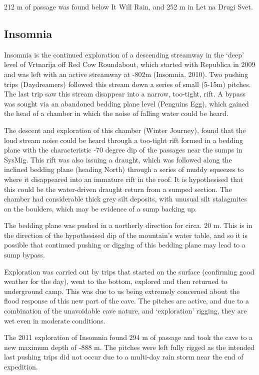 212 m of passage was found below It Will Rain, and 252 m in Let na Drugi
Svet.

\subsection{Insomnia}

Insomnia is the continued exploration of a descending streamway in the
`deep' level of Vrtnarija off Red Cow Roundabout, which started with
Republica in 2009 and was left with an active streamway at -802m
(Insomnia, 2010). Two pushing trips (Daydreamers) followed this stream
down a series of small (5-15m) pitches. The last trip saw this stream
disappear into a narrow, too-tight, rift. A bypass was sought via an
abandoned bedding plane level (Penguins Egg), which gained the head of a
chamber in which the noise of falling water could be heard.

The descent and exploration of this chamber (Winter Journey), found that
the loud stream noise could be heard through a too-tight rift formed in
a bedding plane with the characteristic -70 degree dip of the passages
near the sumps in SysMig. This rift was also issuing a draught, which
was followed along the inclined bedding plane (heading North) through a
series of muddy squeezes to where it disappeared into an immature rift
in the roof. It is hypothesised that this could be the water-driven
draught return from a sumped section. The chamber had considerable thick
grey silt deposits, with unusual silt stalagmites on the boulders, which
may be evidence of a sump backing up.

The bedding plane was pushed in a northerly direction for circa. 20 m.
This is in the direction of the hypothesised dip of the mountain's water
table, and so it is possible that continued pushing or digging of this
bedding plane may lead to a sump bypass.

Exploration was carried out by trips that started on the surface
(confirming good weather for the day), went to the bottom, explored and
then returned to underground camp. This was due to us being extremely
concerned about the flood response of this new part of the cave. The
pitches are active, and due to a combination of the unavoidable cave
nature, and `exploration' rigging, they are wet even in moderate
conditions.

The 2011 exploration of Insomnia found 294 m of passage and took the
cave to a new maximum depth of -888 m. The pitches were left fully
rigged as the intended last pushing trips did not occur due to a
multi-day rain storm near the end of expedition.

